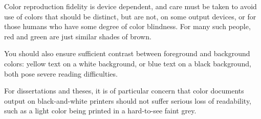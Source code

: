 Color reproduction fidelity is device dependent, and care must be
taken to avoid use of colors that should be distinct, but are not, on
some output devices, or for those humans who have some degree of color
blindness.  For many such people, red and green are just similar
shades of brown.

You should also ensure sufficient contrast between foreground and
background colors: yellow text on a white background, or blue text on
a black background, both pose severe reading difficulties.

For dissertations and theses, it is of particular concern that color
documents output on black-and-white printers should not suffer serious
loss of readability, such as a light color being printed in a
hard-to-see faint grey.
